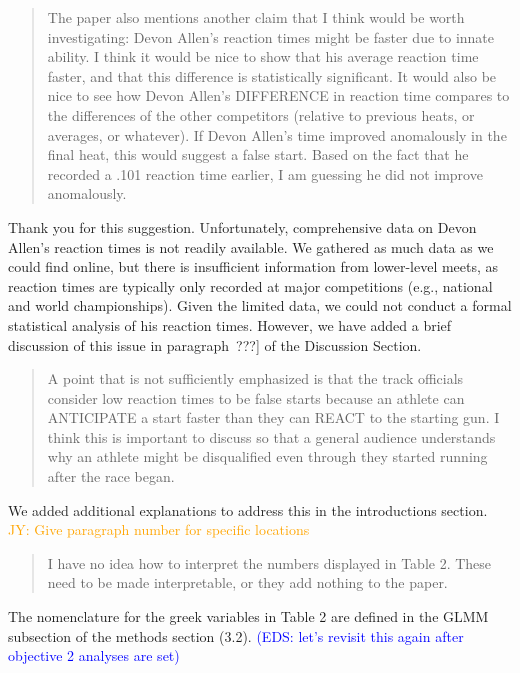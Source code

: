 \documentclass[12pt]{article}
\newcommand{\jy}[1]{\textcolor{orange}{JY: #1}}
\newcommand{\eds}[1]{\textcolor{blue}{(EDS: #1)}}
\newenvironment{comment}%
{\begin{quotation}\noindent\small\it\color{darkblue}\ignorespaces%
}{\end{quotation}}
\begin{document}
\begin{comment}
The paper also mentions another claim that I think would be worth investigating:
Devon Allen’s reaction times might be faster due to innate ability. I think it
would be nice to show that his average reaction time faster, and that this
difference is statistically significant. It would also be nice to see how Devon
Allen’s DIFFERENCE in reaction time compares to the differences of the other
competitors (relative to previous heats, or averages, or whatever). If Devon
Allen’s time improved anomalously in the final heat, this would suggest a false
start. Based on the fact that he recorded a .101 reaction time earlier, I am
guessing he did not improve anomalously.  
\end{comment}

Thank you for this suggestion. Unfortunately, comprehensive data on
Devon Allen's reaction times is not readily available. We gathered as
much data as we could find online, but there is insufficient
information from lower-level meets, as reaction times are typically
only recorded at major competitions (e.g., national and world
championships). Given the limited data, we could not conduct a formal
statistical analysis of his reaction times. However, we have added a
brief discussion of this issue in paragraph~???] of the Discussion Section.


\begin{comment}
A point that is not sufficiently emphasized is that the track officials consider
low reaction times to be false starts because an athlete can ANTICIPATE a start
faster than they can REACT to the starting gun. I think this is important to
discuss so that a general audience understands why an athlete might be
disqualified even through they started running after the race began.  
\end{comment}

We added additional explanations to address this in the introductions section.
\jy{Give paragraph number for specific locations}

\begin{comment}
I have no idea how to interpret the numbers displayed in Table 2. These
need to be made interpretable, or they add nothing to the paper.
\end{comment}

The nomenclature for the greek variables in Table 2 are defined in the GLMM
subsection of the methods section (3.2).
\eds{let's revisit this again after objective 2 analyses are set}
\end{document}
